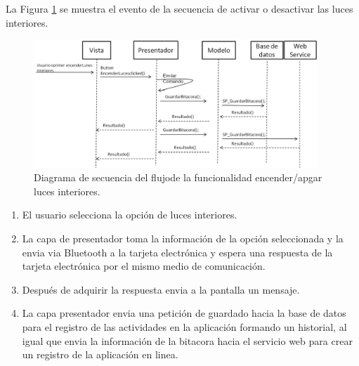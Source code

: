 La Figura \ref{ds8} se muestra el evento de la secuencia de activar o desactivar las luces interiores.\\
\begin{figure}[H]
\centering
\includegraphics[width=0.95\textwidth]{metodologia/DSEncenderLucesInteriores.jpg}
\caption{Diagrama de secuencia del flujode la funcionalidad encender/apgar luces interiores.}
\label{ds8}
\end{figure}
%
 \begin{enumerate}
\item El usuario selecciona la opción de luces interiores.
\item La capa de presentador toma la información de la opción seleccionada y la envia via Bluetooth a la tarjeta electrónica y espera una respuesta de la tarjeta electrónica por el mismo medio de comunicación.
\item Después de adquirir la respuesta envia a la pantalla un mensaje.
\item La capa presentador envia una petición de guardado hacia la base de datos para el registro de las actividades en la aplicación formando un historial, al igual que envia la información de la bitacora hacia el servicio web para crear un registro de la aplicación en linea.
\end{enumerate}

